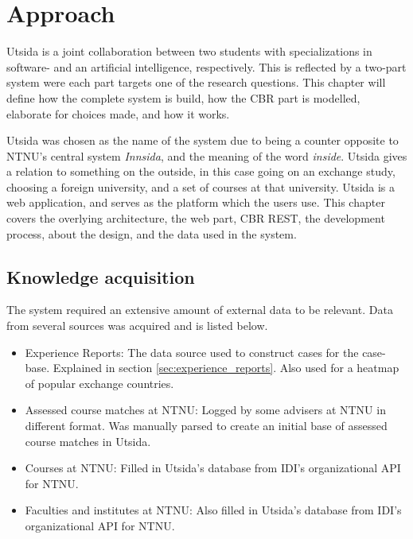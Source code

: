 
\chapter{Approach}

Utsida is a joint collaboration between two students with specializations in software- and an artificial intelligence, respectively. This is reflected by a two-part system were each part targets one of the research questions. This chapter will define how the complete system is build, how the CBR part is modelled, elaborate for choices made, and how it works.

Utsida was chosen as the name of the system due to being a counter opposite to NTNU's central system \emph{Innsida}, and the meaning of the word \emph{inside}. Utsida gives a relation to something on the outside, in this case going on an exchange study, choosing a foreign university, and a set of courses at that university. Utsida is a web application, and serves as the platform which the users use. This chapter covers the overlying architecture, the web part, CBR REST, the development process, about the design, and the data used in the system.

\section{Knowledge acquisition}

The system required an extensive amount of external data to be relevant. Data from several sources was acquired and is listed below.

\begin{itemize}
    \item Experience Reports: The data source used to construct cases for the case-base. Explained in section \ref{sec:experience_reports}. Also used for a heatmap of popular exchange countries. 
    \item Assessed course matches at NTNU: Logged by some advisers at NTNU in different format. Was manually parsed to create an initial base of assessed course matches in Utsida.
    \item Courses at NTNU: Filled in Utsida's database from IDI's organizational API for NTNU. 
    \item Faculties and institutes at NTNU: Also filled in Utsida's database from IDI's organizational API for NTNU.
\end{itemize}

